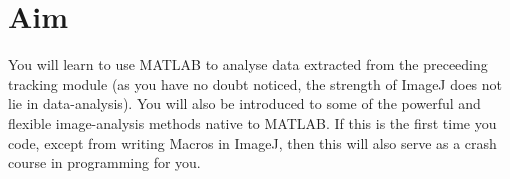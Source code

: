 \section{Aim}
You will learn to use MATLAB to analyse data extracted from the preceeding tracking module (as you have no doubt noticed, the strength of ImageJ does not lie in data-analysis).
You will also be introduced to some of the powerful and flexible image-analysis methods native to MATLAB\@.
If this is the first time you code, except from writing Macros in ImageJ, then this will also serve as a crash course in programming for you.